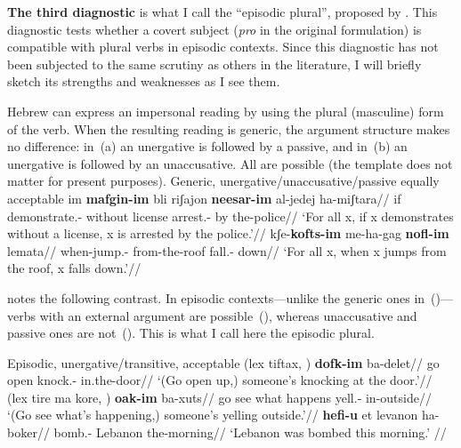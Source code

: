 
\textbf{The third diagnostic} is what I call the ``episodic plural'', proposed by \cite{borer98csli,borer05vol2}. This diagnostic tests whether a covert subject (\emph{pro} in the original formulation) is compatible with plural verbs in episodic contexts. Since this diagnostic has not been subjected to the same scrutiny as others in the literature, I will briefly sketch its strengths and weaknesses as I see them.

Hebrew can express an impersonal reading by using the plural (masculine) form of the verb. When the resulting reading is generic, the argument structure makes no difference: in~(\nextx a) an unergative is followed by a passive, and in~(\nextx b) an unergative is followed by an unaccusative. All are possible (the template does not matter for present purposes).
\pex Generic, unergative/unaccusative/passive equally acceptable \citep[86]{borer98csli}
	\a \begingl
		\gla im \textbf{mafgin-im} bli riʃajon \textbf{neesar-im} al-jedej ha-miʃtara//
		\glb if demonstrate.- without license arrest.- by the-police//
		\glft `For all x, if x demonstrates without a license, x is arrested by the police.'//
	\endgl
	\a \begingl
		\gla kʃe-\textbf{kofts-im} me-ha-gag \textbf{nofl-im} lemata//
		\glb when-jump.- from-the-roof fall.- down//
		\glft `For all x, when x jumps from the roof, x falls down.'//
	\endgl
\xe

\cite{borer98csli} notes the following contrast. In episodic contexts---unlike the generic ones in~(\lastx)---verbs with an external argument are possible~(\nextx), whereas unaccusative and passive ones are not~(\anextx). This is what I call here the episodic plural.

\pex Episodic, unergative/transitive, acceptable
	\a \begingl
		\gla (lex tiftax, ) \textbf{dofk-im} ba-delet//
		\glb go open {} knock.- in.the-door//
		\glft `(Go open up,) someone's knocking at the door.'//
	\endgl
	\a \begingl
		\gla (lex tire ma kore, ) \textbf{{\ts}oak-im} ba-xuts//
		\glb go see what happens {} yell.- in-outside//
		\glft `(Go see what's happening,) someone's yelling outside.'//
	\endgl
	\a \begingl
		\gla \textbf{hef{\ts}i{\ts}-u} et levanon ha-boker//
		\glb bomb.-  Lebanon the-morning//
		\glft `Lebanon was bombed this morning.'  //
	\endgl
\xe

